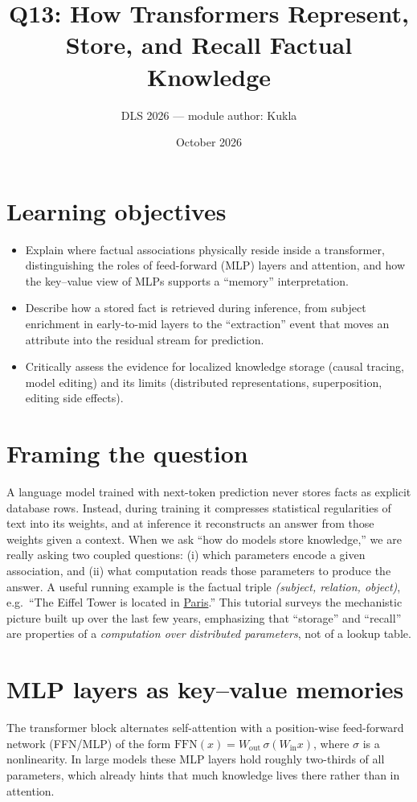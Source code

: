 \documentclass[11pt]{article}
\title{Q13: How Transformers Represent, Store, and Recall Factual Knowledge}
\author{DLS 2026 --- module author: Kukla}
\date{October 2026}
\begin{document}
\maketitle

\section*{Learning objectives}
\begin{itemize}[leftmargin=*]
  \item Explain where factual associations physically reside inside a transformer, distinguishing the roles of feed-forward (MLP) layers and attention, and how the key--value view of MLPs supports a ``memory'' interpretation.
  \item Describe how a stored fact is retrieved during inference, from subject enrichment in early-to-mid layers to the ``extraction'' event that moves an attribute into the residual stream for prediction.
  \item Critically assess the evidence for localized knowledge storage (causal tracing, model editing) and its limits (distributed representations, superposition, editing side effects).
\end{itemize}

\section{Framing the question}
A language model trained with next-token prediction never stores facts as explicit database rows. Instead, during training it compresses statistical regularities of text into its weights, and at inference it reconstructs an answer from those weights given a context. When we ask ``how do models store knowledge,'' we are really asking two coupled questions: (i) which parameters encode a given association, and (ii) what computation reads those parameters to produce the answer. A useful running example is the factual triple \emph{(subject, relation, object)}, e.g.\ ``The Eiffel Tower is located in \underline{Paris}.'' This tutorial surveys the mechanistic picture built up over the last few years, emphasizing that ``storage'' and ``recall'' are properties of a \emph{computation over distributed parameters}, not of a lookup table.

\section{MLP layers as key--value memories}
The transformer block alternates self-attention with a position-wise feed-forward network (FFN/MLP) of the form $\mathrm{FFN}(x)=W_{\text{out}}\,\sigma(W_{\text{in}}x)$, where $\sigma$ is a nonlinearity. In large models these MLP layers hold roughly two-thirds of all parameters, which already hints that much knowledge lives there rather than in attention.
\end{document}
